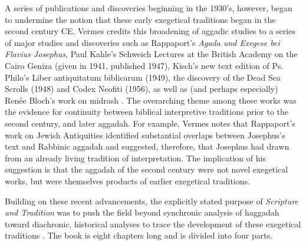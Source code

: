 A series of publications and discoveries beginning in the 1930's,
however, began to undermine the notion that these early exegetical
traditions began in the second century CE. Vermes credits this
broadening of aggadic studies to a series of major studies and
discoveries such as Rappaport's \emph{Agada und Exegese bei Flavius
Josephus},\autocite{rappaport1930} Paul Kahle's Schweich Lectures at the
British Academy on the Cairo Geniza (given in 1941, published
1947),\autocite{kahle1947} Kisch's new text edition of Ps. Philo's
Liber antiquitatum biblicarum (1949),\autocite{kisch1949} the discovery
of the Dead Sea Scrolls (1948) and Codex Neofiti (1956), as well as (and
perhaps especially) Renée Bloch's work on midrash
\autocites{bloch1954}{bloch1955_repr}[3--7]{vermes1961}. The overarching
theme among these works was the evidence for continuity between biblical
interpretive traditions prior to the second century, and later aggadah.
For example, Vermes notes that Rappaport's work on Jewish Antiquities
identified substantial overlaps between Josephus's text and Rabbinic
aggadah and suggested, therefore, that Josephus had drawn from an
already living tradition of interpretation. The implication of his
suggestion is that the aggadah of the second century were not novel
exegetical works, but were themselves products of earlier exegetical
traditions.

Building on these recent advancements, the explicitly stated purpose of
\emph{Scripture and Tradition} was to push the field beyond synchronic
analysis of haggadah toward diachronic, historical analyses to trace the
development of these exegetical traditions \autocites[1]{vermes1961}[See
also][]{bloch1955_repr}. The book is eight chapters long and is divided
into four parts.

